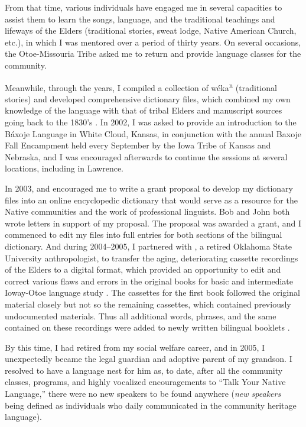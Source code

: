 \documentclass[output=paper]{LSP/langsci}
\begin{document}
From that time, various individuals have engaged me in several capacities to assist them to learn the songs, language, and the traditional teachings and lifeways of the Elders (traditional stories, sweat lodge, Native American Church, etc.), in which I was mentored over a period of thirty years. On several occasions, the Otoe-Missouria Tribe asked me to return and provide language classes for the community.  

Meanwhile, through the years, I compiled a collection of w\'eka\textsuperscript{n} (traditional stories) and developed comprehensive dictionary files, which combined my own knowledge of the language with that of tribal Elders and manuscript sources going back to the 1830's \citep{Goodtracks1992}. In 2002, I was asked to provide an introduction to the B\'axoje Language in White Cloud, Kansas, in conjunction with the annual Baxoje Fall Encampment held every September by the Iowa Tribe of Kansas and Nebraska, and I was encouraged afterwards to continue the sessions at several locations, including in Lawrence. 

In 2003,  and  encouraged me to write a grant proposal to develop my dictionary files into an online encyclopedic dictionary that would serve as a resource for the Native communities and the work of professional linguists. Bob and John both wrote letters in support of my proposal. The proposal was awarded a grant, and I commenced to edit my files into full entries for both sections of the bilingual dictionary. And during 2004--2005, I partnered with , a retired Oklahoma State University anthropologist, to transfer the aging, deteriorating cassette recordings of the Elders to a digital format, which provided an opportunity to edit and correct various flaws and errors in the original books for basic and intermediate Ioway-Otoe language study \citep{OtoeIowaWistrandRobinson1977, OtoeIowaWistrandRobinson1978}. The cassettes for the first book followed the original material closely but not so the remaining cassettes, which contained previously undocumented materials. Thus all additional words, phrases, and the same contained on these recordings were added to newly written bilingual booklets \citep{Goodtracks2004a, Goodtracks2004b}.

By this time, I had retired from my social welfare career, and in 2005, I unexpectedly became the legal guardian and adoptive parent of my grandson. I resolved to have a language nest for him as, to date, after all the community classes, programs, and highly vocalized encouragements to ``Talk Your Native Language,'' there were no new speakers to be found anywhere (\emph{new speakers} being defined as individuals who daily communicated in the community heritage language).  
\end{document}
